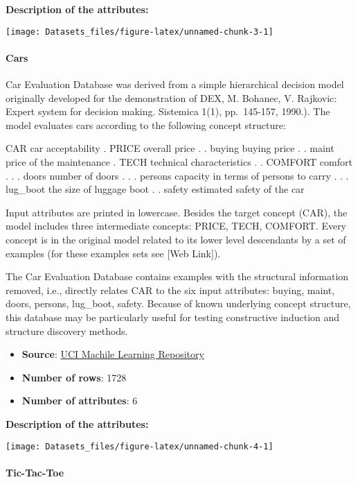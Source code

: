 \documentclass[]{article}
\providecommand{\tightlist}{%
  \setlength{\itemsep}{0pt}\setlength{\parskip}{0pt}}
\let\oldparagraph\paragraph
\renewcommand{\paragraph}[1]{\oldparagraph{#1}\mbox{}}
\begin{document}
\textbf{Description of the attributes:}

\texttt{[image: Datasets\_files/figure-latex/unnamed-chunk-3-1]}

\hypertarget{Cars}{%
\paragraph{Cars}\label{Cars}}

Car Evaluation Database was derived from a simple hierarchical decision
model originally developed for the demonstration of DEX, M. Bohanec, V.
Rajkovic: Expert system for decision making. Sistemica 1(1),
pp.~145-157, 1990.). The model evaluates cars according to the following
concept structure:

CAR car acceptability . PRICE overall price . . buying buying price . .
maint price of the maintenance . TECH technical characteristics . .
COMFORT comfort . . . doors number of doors . . . persons capacity in
terms of persons to carry . . . lug\_boot the size of luggage boot . .
safety estimated safety of the car

Input attributes are printed in lowercase. Besides the target concept
(CAR), the model includes three intermediate concepts: PRICE, TECH,
COMFORT. Every concept is in the original model related to its lower
level descendants by a set of examples (for these examples sets see
{[}Web Link{]}).

The Car Evaluation Database contains examples with the structural
information removed, i.e., directly relates CAR to the six input
attributes: buying, maint, doors, persons, lug\_boot, safety. Because of
known underlying concept structure, this database may be particularly
useful for testing constructive induction and structure discovery
methods.

\begin{itemize}
\tightlist
\item
  \textbf{Source}:
  \href{http://archive.ics.uci.edu/ml/datasets/Car+Evaluation}{UCI
  Machile Learning Repository}
\item
  \textbf{Number of rows}: 1728
\item
  \textbf{Number of attributes}: 6
\end{itemize}

\textbf{Description of the attributes:}

\texttt{[image: Datasets\_files/figure-latex/unnamed-chunk-4-1]}

\hypertarget{Tic-Tac-Toe}{%
\paragraph{Tic-Tac-Toe}\label{Tic-Tac-Toe}}
\end{document}
